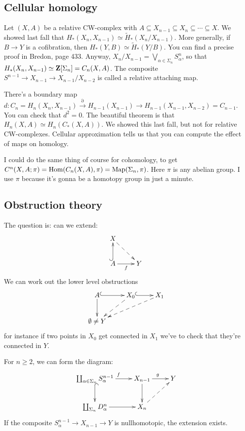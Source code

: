 \subsection{Cellular homology}
Let $(X,A)$ be a relative CW-complex with $A\subseteq X_{n-1}\subseteq X_n\subseteq\cdots\subseteq X$. We showed last fall that $H_\ast(X_n,X_{n-1})\simeq \widetilde{H}_\ast(X_n/X_{n-1})$. More generally, if $B\to Y$ is a cofibration, then $H_\ast(Y,B)\simeq\widetilde{H}_\ast(Y/B)$. You can find a precise proof in Bredon, page 433. Anyway, $X_n/X_{n-1} = \bigvee_{\alpha\in \Sigma_n}S^n_\alpha$, so that $H_\ast(X_n,X_{n-1})\simeq \mathbf Z[\Sigma_n] = C_n(X,A)$. The composite $S^{n-1}\to X_{n-1}\to X_{n-1}/X_{n-2}$ is called a relative attaching map.

There's a boundary map $d:C_n = H_n(X_n,X_{n-1})\xrightarrow{\partial}H_{n-1}(X_{n-1})\to H_{n-1}(X_{n-1},X_{n-2}) = C_{n-1}$. You can check that $d^2 = 0$. The beautiful theorem is that $H_n(X,A)\simeq H_n(C_\ast(X,A))$. We showed this last fall, but not for relative CW-complexes. Cellular approximation tells us that you can compute the effect of maps on homology.

I could do the same thing of course for cohomology, to get $C^n(X,A;\pi) = \operatorname{Hom}(C_n(X,A),\pi) = \operatorname{Map}(\Sigma_n,\pi)$. Here $\pi$ is any abelian group. I use $\pi$ because it's gonna be a homotopy group in just a minute.
\subsection{Obstruction theory}
The question is: can we extend:
\begin{equation*}
    \xymatrix{
	X\ar@{-->}[dr] & \\
	A\ar@{^(->}[u]\ar[r]_f & Y
    }
\end{equation*}
We can work out the lower level obstructions
\begin{equation*}
    \xymatrix{
	A\ar[d]\ar@{^(->}[r] & X_0\ar@{-->}[dl]\ar@{^(->}[r] & X_1\ar@{-->}[dll]\\
	\emptyset\neq Y & &
    }
\end{equation*}
for instance if two points in $X_0$ get connected in $X_1$ we've to check that they're connected in $Y$.

For $n\geq 2$, we can form the diagram:
\begin{equation*}
    \xymatrix{
	\coprod_{\alpha\in\Sigma_n}S^{n-1}_\alpha\ar[r]^f\ar@{^(->}[d] & X_{n-1}\ar[r]^g\ar[d] & Y\\
	\coprod_{\Sigma_n}D^n_\alpha\ar[r] & X_n\ar@{-->}[ur] & 
    }
\end{equation*}
If the composite $S^{n-1}_\alpha\to X_{n-1}\to Y$ is nullhomotopic, the extension exists.

